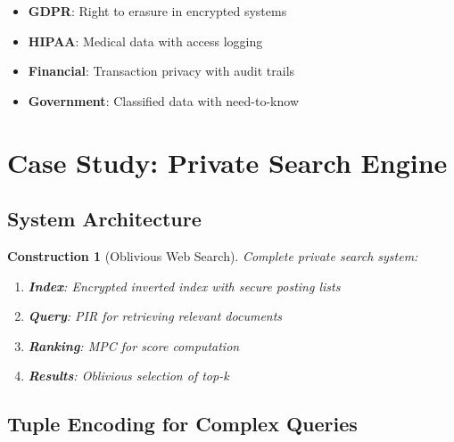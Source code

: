 \documentclass[11pt,final,hidelinks]{article}
\newtheorem{construction}[theorem]{Construction}
\begin{document}
\begin{itemize}
    \item \textbf{GDPR}: Right to erasure in encrypted systems
    \item \textbf{HIPAA}: Medical data with access logging
    \item \textbf{Financial}: Transaction privacy with audit trails
    \item \textbf{Government}: Classified data with need-to-know
\end{itemize}

\section{Case Study: Private Search Engine}

\subsection{System Architecture}

\begin{construction}[Oblivious Web Search]
Complete private search system:
\begin{enumerate}
    \item \textbf{Index}: Encrypted inverted index with secure posting lists
    \item \textbf{Query}: PIR for retrieving relevant documents
    \item \textbf{Ranking}: MPC for score computation
    \item \textbf{Results}: Oblivious selection of top-k
\end{enumerate}
\end{construction}

\subsection{Tuple Encoding for Complex Queries}
\end{document}
